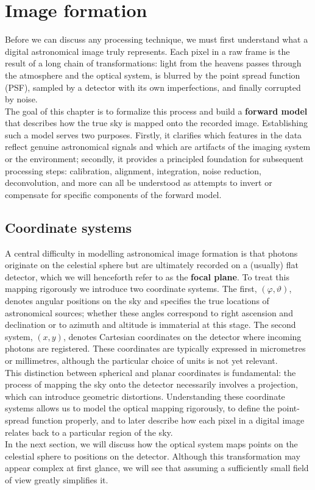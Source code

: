 \chapter{Image formation}
Before we can discuss any processing technique, we must first understand what a digital astronomical image truly represents.
Each pixel in a raw frame is the result of a long chain of transformations: light from the heavens passes through the atmosphere and the optical system, is blurred by the point spread function (PSF), sampled by a detector with its own imperfections, and finally corrupted by noise.
\\[\baselineskip]
The goal of this chapter is to formalize this process and build a \textbf{forward model} that describes how the true sky is mapped onto the recorded image.
Establishing such a model serves two purposes.
Firstly, it clarifies which features in the data reflect genuine astronomical signals and which are artifacts of the imaging system or the environment; secondly, it provides a principled foundation for subsequent processing steps: calibration, alignment, integration, noise reduction, deconvolution, and more can all be understood as attempts to invert or compensate for specific components of the forward model.

\section{Coordinate systems}
A central difficulty in modelling astronomical image formation is that photons originate on the celestial sphere but are ultimately recorded on a (usually) flat detector, which we will henceforth refer to as the \textbf{focal plane}.
To treat this mapping rigorously we introduce two coordinate systems. The first, $(\varphi,\vartheta)$, denotes angular positions on the sky and specifies the true locations of astronomical sources; whether these angles correspond to right ascension and declination or to azimuth and altitude is immaterial at this stage.
The second system, $(x,y)$, denotes Cartesian coordinates on the detector where incoming photons are registered.
These coordinates are typically expressed in micrometres or millimetres, although the particular choice of units is not yet relevant.
\\[\baselineskip]
This distinction between spherical and planar coordinates is fundamental: the process of mapping the sky onto the detector necessarily involves a projection, which can introduce geometric distortions.
Understanding these coordinate systems allows us to model the optical mapping rigorously, to define the point-spread function properly, and to later describe how each pixel in a digital image relates back to a particular region of the sky.\\[\baselineskip]
In the next section, we will discuss how the optical system maps points on the celestial sphere to positions on the detector.
Although this transformation may appear complex at first glance, we will see that assuming a sufficiently small field of view greatly simplifies it.

